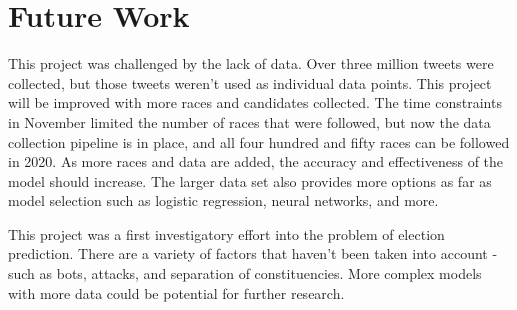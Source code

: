 \documentclass[11pt, twoside, reqno]{book}
\begin{document}
\section{Future Work}
\hspace{0.2in} This project was challenged by the lack of data. Over three million tweets were collected, but those tweets weren't used as individual data points. This project will be improved with more races and candidates collected. The time constraints in November limited the number of races that were followed, but now the data collection pipeline is in place, and all four hundred and fifty races can be followed in 2020. As more races and data are added, the accuracy and effectiveness of the model should increase. The larger data set also provides more options as far as model selection such as logistic regression, neural networks, and more. 

This project was a first investigatory effort into the problem of election prediction. There are a variety of factors that haven't been taken into account - such as bots, attacks, and separation of constituencies. More complex models with more data could be potential for further research. 
\end{document}
